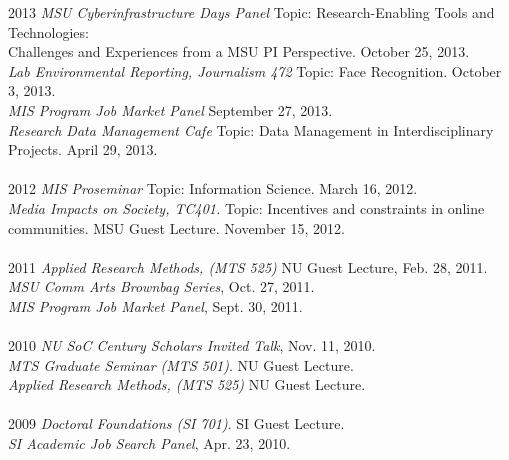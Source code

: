 \documentclass[9pt]{extarticle}
\begin{document}
\begin{tabbing}
2013 \hspace{0.3in}\=  \emph{MSU Cyberinfrastructure Days Panel} Topic: Research-Enabling Tools and Technologies:\\
\> \hspace{0.5cm} Challenges and Experiences from a MSU PI Perspective. October 25, 2013.\\ 
\> \emph{Lab Environmental Reporting, Journalism 472} Topic: Face Recognition. October 3, 2013. \\
\> \emph{MIS Program Job Market Panel} September 27, 2013. \\
\> \emph{Research Data Management Cafe} Topic: Data Management in Interdisciplinary \\
\> \hspace{0.5cm} Projects. April 29, 2013. \\\\ %

2012 \hspace{0.3in}\=  \emph{MIS Proseminar} Topic: Information Science. March 16, 2012.\\
\> \emph{Media Impacts on Society, TC401.} Topic: Incentives and constraints in online \\
\> \hspace{0.5cm} communities. MSU Guest Lecture. November 15, 2012. \\\\

2011 \hspace{0.3in}\= \emph{Applied Research Methods, (MTS 525)} NU Guest Lecture, Feb. 28, 2011. \\
\> \emph{MSU Comm Arts Brownbag Series}, Oct. 27, 2011. \\
\> \emph{MIS Program Job Market Panel}, Sept. 30, 2011. \\\\

2010 \hspace{0.3in}\= \emph{NU SoC Century Scholars Invited Talk}, Nov. 11, 2010. \\
\> \emph{MTS Graduate Seminar (MTS 501)}. NU Guest Lecture. \\
\> \emph{Applied Research Methods, (MTS 525)} NU Guest Lecture. \\\\

2009 \hspace{0.3in}\= \emph{Doctoral Foundations (SI 701)}. SI Guest Lecture. \\
\> \emph{SI Academic Job Search Panel}, Apr. 23, 2010. \\\\


\end{tabbing}
\end{document}
